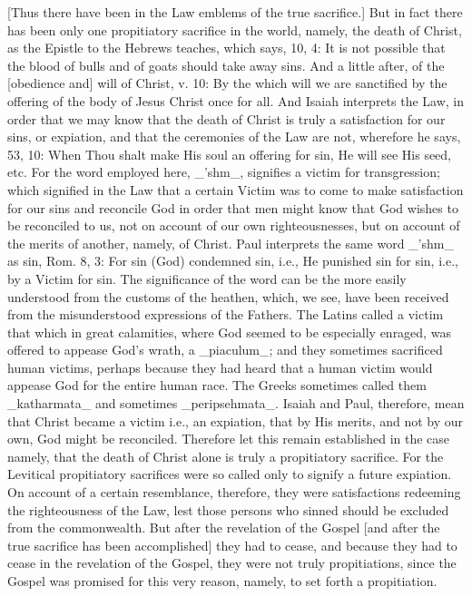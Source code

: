 [Thus there have been in the Law emblems of the true sacrifice.] But
in fact there has been only one propitiatory sacrifice in the world,
namely, the death of Christ, as the Epistle to the Hebrews teaches,
which says, 10, 4: It is not possible that the blood of bulls and of
goats should take away sins.  And a little after, of the [obedience
and] will of Christ, v. 10: By the which will we are sanctified by
the offering of the body of Jesus Christ once for all.  And Isaiah
interprets the Law, in order that we may know that the death of
Christ is truly a satisfaction for our sins, or expiation, and that
the ceremonies of the Law are not, wherefore he says, 53, 10: When
Thou shalt make His soul an offering for sin, He will see His seed,
etc. For the word employed here, _'shm_, signifies a victim for
transgression; which signified in the Law that a certain Victim was
to come to make satisfaction for our sins and reconcile God in order
that men might know that God wishes to be reconciled to us, not on
account of our own righteousnesses, but on account of the merits of
another, namely, of Christ.  Paul interprets the same word _'shm_ as
sin, Rom. 8, 3: For sin (God) condemned sin, i.e., He punished sin
for sin, i.e., by a Victim for sin.  The significance of the word can
be the more easily understood from the customs of the heathen, which,
we see, have been received from the misunderstood expressions of the
Fathers.  The Latins called a victim that which in great calamities,
where God seemed to be especially enraged, was offered to appease
God's wrath, a _piaculum_; and they sometimes sacrificed human
victims, perhaps because they had heard that a human victim would
appease God for the entire human race.  The Greeks sometimes called
them _katharmata_ and sometimes _peripsehmata_.  Isaiah and Paul,
therefore, mean that Christ became a victim i.e., an expiation, that
by His merits, and not by our own, God might be reconciled.
Therefore let this remain established in the case namely, that the
death of Christ alone is truly a propitiatory sacrifice.  For the
Levitical propitiatory sacrifices were so called only to signify a
future expiation.  On account of a certain resemblance, therefore,
they were satisfactions redeeming the righteousness of the Law, lest
those persons who sinned should be excluded from the commonwealth.
But after the revelation of the Gospel [and after the true sacrifice
has been accomplished] they had to cease, and because they had to
cease in the revelation of the Gospel, they were not truly
propitiations, since the Gospel was promised for this very reason,
namely, to set forth a propitiation.

